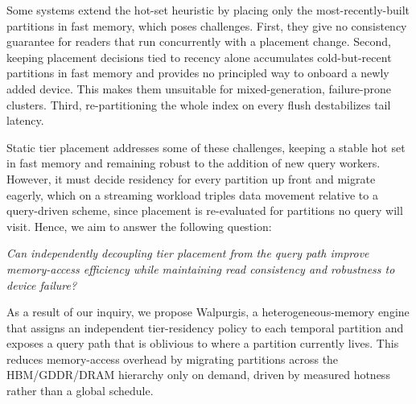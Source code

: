 \documentclass{article}
\begin{document}
Some systems extend the hot-set heuristic by placing only the most-recently-built
partitions in fast memory, which poses challenges. First, they give no consistency
guarantee for readers that run concurrently with a placement change. Second, keeping
placement decisions tied to recency alone accumulates cold-but-recent partitions in
fast memory and provides no principled way to onboard a newly added device. This makes
them unsuitable for mixed-generation, failure-prone clusters. Third, re-partitioning the
whole index on every flush destabilizes tail latency.

Static tier placement addresses some of these challenges, keeping a stable hot set in
fast memory and remaining robust to the addition of new query workers. However, it must
decide residency for every partition up front and migrate eagerly, which on a streaming
workload triples data movement relative to a query-driven scheme, since placement is
re-evaluated for partitions no query will visit. Hence, we aim to answer the following
question:

\begin{center}
\emph{Can independently decoupling tier placement from the query path improve
memory-access efficiency while maintaining read consistency and robustness to device
failure?}
\end{center}

As a result of our inquiry, we propose Walpurgis, a heterogeneous-memory engine that
assigns an independent tier-residency policy to each temporal partition and exposes a
query path that is oblivious to where a partition currently lives. This reduces
memory-access overhead by migrating partitions across the HBM/GDDR/DRAM hierarchy only
on demand, driven by measured hotness rather than a global schedule.
\end{document}
